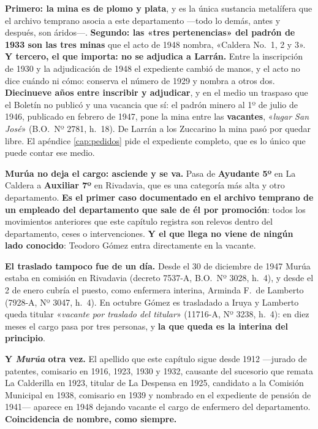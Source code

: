 \begin{cautela}
\textbf{Primero: la mina es de plomo y plata}, y es la única sustancia metalífera que el
archivo temprano asocia a este departamento ---todo lo demás, antes y después, son áridos---.
\textbf{Segundo: las «tres pertenencias» del padrón de 1933 son las tres minas} que el acto
de 1948 nombra, «Caldera No.\ 1, 2 y 3». \textbf{Y tercero, el que importa: no se adjudica a
Larrán.} Entre la inscripción de 1930 y la adjudicación de 1948 el expediente cambió de
manos, y el acto no dice cuándo ni cómo: conserva el número de 1929 y nombra a otros dos.
\textbf{Diecinueve años entre inscribir y adjudicar}, y en el medio un traspaso que el
Boletín no publicó y una vacancia que sí: el padrón minero al 1º de julio de 1946, publicado en
febrero de 1947, pone la mina entre las \textbf{vacantes}, «\textit{lugar San José}» (B.O.\ Nº 2781,
h.\ 18). De Larrán a los Zuccarino la mina pasó por quedar libre. El apéndice \ref{cap:pedidos} pide el expediente completo, que es lo
único que puede contar ese medio.

\begin{cautela}
\textbf{Murúa no deja el cargo: asciende y se va.} Pasa de \textbf{Ayudante 5º} en La Caldera
a \textbf{Auxiliar 7º} en Rivadavia, que es una categoría más alta y otro departamento.
\textbf{Es el primer caso documentado en el archivo temprano de un empleado del departamento
que sale de él por promoción}: todos los movimientos anteriores que este capítulo registra son
relevos dentro del departamento, ceses o intervenciones. \textbf{Y el que llega no viene de
ningún lado conocido}: Teodoro Gómez entra directamente en la vacante.

\textbf{El traslado tampoco fue de un día.} Desde el 30 de diciembre de 1947 Murúa estaba en
comisión en Rivadavia (decreto 7537-A, B.O.\ Nº 3028, h.\ 4), y desde el 2 de enero cubría el
puesto, como enfermera interina, Arminda F.\ de Lamberto (7928-A, Nº 3047, h.\ 4). En octubre Gómez
es trasladado a Iruya y Lamberto queda titular «\textit{vacante por traslado del titular}» (11716-A,
Nº 3238, h.\ 4): en diez meses el cargo pasa por tres personas, y \textbf{la que queda es la
interina del principio}.
\end{cautela}

\textbf{Y \textit{Murúa} otra vez.} El apellido que este capítulo sigue desde 1912 ---jurado
de patentes, comisario en 1916, 1923, 1930 y 1932, causante del sucesorio que remata La
Calderilla en 1923, titular de La Despensa en 1925, candidato a la Comisión Municipal en 1938,
comisario en 1939 y nombrado en el expediente de pensión de 1941--- aparece en 1948 dejando
vacante el cargo de enfermero del departamento. \textbf{Coincidencia de nombre, como siempre.}


\end{cautela}
